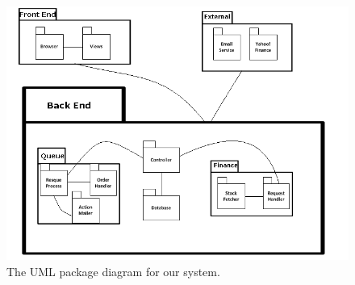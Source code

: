 \begin{figure}[!h]
\centering
\includegraphics[width=7in]{./img/package.png}
\caption{The UML package diagram for our system.}
\end{figure}
